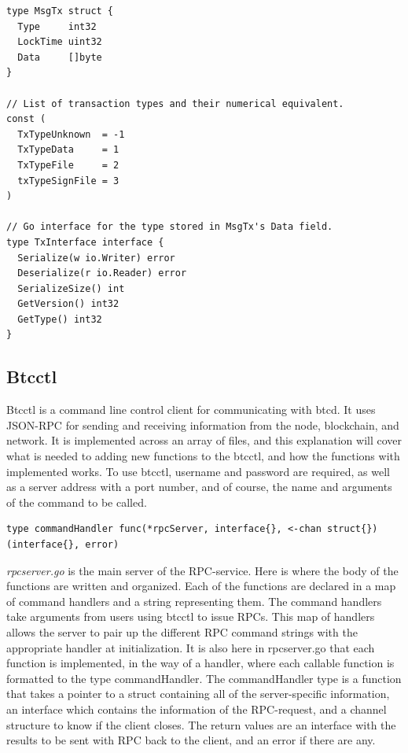 \documentclass[12pt]{article}
\begin{document}
\begin{lstlisting}[float=!ht,caption={Transaction structure},label=lst:new_transaction_structs]
type MsgTx struct {
  Type     int32
  LockTime uint32
  Data     []byte
}

// List of transaction types and their numerical equivalent.
const (
  TxTypeUnknown  = -1
  TxTypeData     = 1
  TxTypeFile     = 2
  txTypeSignFile = 3
)

// Go interface for the type stored in MsgTx's Data field.
type TxInterface interface {
  Serialize(w io.Writer) error
  Deserialize(r io.Reader) error
  SerializeSize() int
  GetVersion() int32
  GetType() int32
}
\end{lstlisting}

\subsection{Btcctl}\label{subsec:btcctl}
Btcctl is a command line control client for communicating with btcd. It uses JSON-RPC for sending and receiving information from the node, blockchain, and network. It is implemented across an array of files, and this explanation will cover what is needed to adding new functions to the btcctl, and how the functions with implemented works. To use btcctl, username and password are required, as well as a server address with a port number, and of course, the name and arguments of the command to be called. 
\begin{lstlisting}[float=h!,caption={Command handler type},label=lst:cmdHandler]
type commandHandler func(*rpcServer, interface{}, <-chan struct{}) (interface{}, error)
\end{lstlisting}

{\it{rpcserver.go}} is the main server of the RPC-service. Here is where the body of the functions are written and organized. Each of the functions are declared in a map of command handlers and a string representing them. The command handlers take arguments from users using btcctl to issue RPCs. This map of handlers allows the server to pair up the different RPC command strings with the appropriate handler at initialization. It is also here in rpcserver.go that each function is implemented, in the way of a handler, where each callable function is formatted to the type commandHandler. The commandHandler type is a function that takes a pointer to a struct containing all of the server-specific information, an interface which contains the information of the RPC-request, and a channel structure to know if the client closes. The return values are an interface with the results to be sent with RPC back to the client, and an error if there are any.
\end{document}
